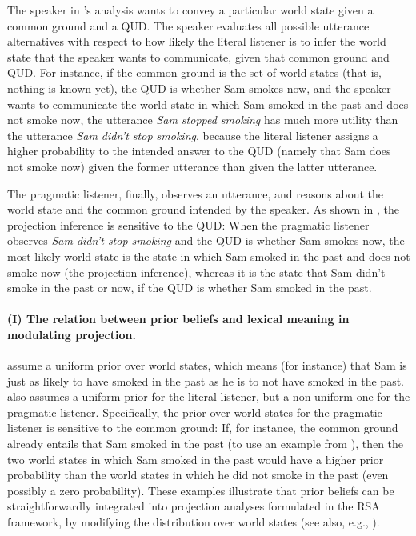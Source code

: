 \documentclass[11pt,fleqn]{article}
\newcommand{\6}{\mbox{$[\hspace*{-.6mm}[$}}
\newcommand{\9}{\mbox{$]\hspace*{-.6mm}]$}}
\newcommand{\citepos}[1]{\citeauthor{#1}'s \citeyear{#1}}
\begin{document}
The speaker in \citepos{qing-etal2016} analysis wants to convey a particular world state given a common ground and a QUD. The speaker evaluates all possible utterance alternatives with respect to how likely the literal listener is to infer the world state that the speaker wants to communicate, given that common ground and QUD. For instance, if the common ground is the set of world states (that is, nothing is known yet), the QUD is whether Sam smokes now, and the speaker wants to communicate the world state in which Sam smoked in the past and does not smoke now, the utterance {\em Sam stopped smoking} has much more utility than the utterance {\em Sam didn't stop smoking}, because the literal listener assigns a higher probability to the intended answer to the QUD (namely that Sam does not smoke now) given the former utterance than given the latter utterance. 

The pragmatic listener, finally, observes an utterance, and reasons about the world state and the common ground intended by the speaker. As shown in \citealt{qing-etal2016}, the projection inference is sensitive to the QUD: When the pragmatic listener observes {\em Sam didn't stop smoking} and the QUD is whether Sam smokes now, the most likely world state is the state in which Sam smoked in the past and does not smoke now (the projection inference), whereas it is the state that Sam didn't smoke in the past or now, if the QUD is whether Sam smoked in the past.

\paragraph{(I) The relation between prior beliefs and lexical meaning in modulating projection.}

\citealt{qing-etal2016} assume a uniform prior over world states, which means (for instance) that Sam is just as likely to have smoked in the past as he is to not have smoked in the past. \citealt{warstadt2022} also assumes a uniform prior for the literal listener, but a non-uniform one for the pragmatic listener. Specifically, the prior over world states for the pragmatic listener is sensitive to the common ground: If, for instance, the common ground already entails that Sam smoked in the past (to use an example from \citealt{qing-etal2016}), then the two world states in which Sam smoked in the past would have a higher prior probability than the world states in which he did not smoke in the past (even possibly a zero probability). These examples illustrate that prior beliefs can be straightforwardly integrated into projection analyses formulated in the RSA framework, by modifying the distribution over world states (see also, e.g., \citealt{goodman-stuhlmueller2013,degen2023-RSA}).
\end{document}
